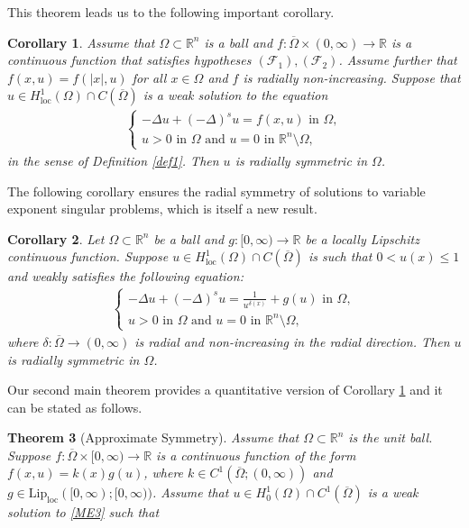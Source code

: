 \documentclass[11pt, notitlepage]{article}
\def\R{\mathbb{R}}
\newcommand{\De} {\Delta}
\newtheorem{Theorem}{Theorem}[section]
\newtheorem{Corollary}[Theorem]{Corollary}
\begin{document}
{This theorem leads us to the following important corollary.
\begin{Corollary}\label{Cor1}
Assume that $\Omega\subset\R^n$ is a ball and $f:\overline{\Omega}\times (0,\infty)\to \R$ is a continuous function that satisfies hypotheses $(\mathscr{F}_1),(\mathscr{F}_2)$. Assume further that $f(x,u)=f(|x|,u)$ for all $x\in\Omega$ and $f$ is radially non-increasing. Suppose that $u\in H^1_{\mathrm{loc}}(\Omega)\cap C(\overline{\Omega})$ is a weak solution to the equation
    \begin{align}\label{ME3}
    \begin{cases}
        -\De u+(-\De )^su=f(x,u)\text{ in }\Omega,\\
    u>0 \text{ in }\Omega \text{ and }u=0\text{ in }\R^n\setminus \Omega,
    \end{cases}
\end{align}
 in the sense of Definition \ref{def1}. Then $u$ is radially symmetric in $\Omega$.
\end{Corollary}
The following corollary ensures the radial symmetry of solutions to variable exponent singular problems, which is itself a new result. 
\begin{Corollary}\label{Cor2}
    Let $\Omega\subset\R^n$ be a ball and $g:[0,\infty)\to \R$ be a locally Lipschitz continuous function. Suppose $u\in H^1_{\mathrm{loc}}(\Omega)\cap C(\overline{\Omega})$ is such that $0<u(x)\leq 1$ and weakly satisfies the following equation:
\begin{align}\label{ME2}
    \begin{cases}
        -\De u+(-\De )^su=\frac{1}{u^{\delta(x)}}+g(u)\text{ in }\Omega,\\
    u>0 \text{ in }\Omega \text{ and }u=0\text{ in }\R^n\setminus \Omega,
    \end{cases}
\end{align}
 where $\delta:\overline{\Omega}\to (0,\infty)$ is radial and non-increasing in the radial direction. Then $u$ is radially symmetric in $\Omega$. 
\end{Corollary}
 Our second main theorem provides a quantitative version of Corollary \ref{Cor1} and it can be stated as follows.
\begin{Theorem}[Approximate Symmetry]\label{T2}
     Assume that $\Omega\subset\R^n$ is the unit ball. Suppose $f:\overline{\Omega}\times[0,\infty)\to\R$ is a continuous function of the form $f(x,u)=k(x)g(u)$, where $k\in C^1(\overline{\Omega};(0,\infty))$ and $g\in \mathrm{Lip}_{\mathrm{loc}}([0,\infty);[0,\infty))$. Assume that $u\in H^1_0(\Omega)\cap C^1(\overline{\Omega})$ is a weak solution to \eqref{ME3} such that 

\end{Theorem}}
\end{document}
